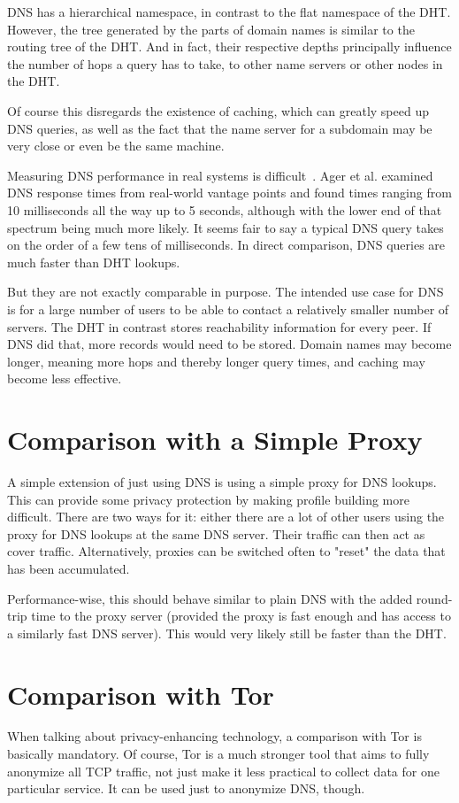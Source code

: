 DNS has a hierarchical namespace, in contrast to the flat namespace of the DHT.
However, the tree generated by the parts of domain names is similar to the
routing tree of the DHT. And in fact, their respective depths principally
influence the number of hops a query has to take, to other name servers or other
nodes in the DHT.

Of course this disregards the existence of caching, which can greatly speed up
DNS queries, as well as the fact that the name server for a subdomain may be
very close or even be the same machine.

Measuring DNS performance in real systems is
difficult~\cite{liston2002diversity}. Ager et al.\cite{ager2010comparing}
examined DNS response times from real-world vantage points and found times
ranging from 10 milliseconds all the way up to 5 seconds, although with the
lower end of that spectrum being much more likely. It seems fair to say a
typical DNS query takes on the order of a few tens of milliseconds. In direct
comparison, DNS queries are much faster than DHT lookups.

But they are not exactly comparable in purpose. The intended use case for DNS is
for a large number of users to be able to contact a relatively smaller number of
servers. The DHT in contrast stores reachability information for every peer. If
DNS did that, more records would need to be stored. Domain names may become
longer, meaning more hops and thereby longer query times, and caching may become
less effective.

\section{Comparison with a Simple Proxy}
A simple extension of just using DNS is using a simple proxy for DNS lookups.
This can provide some privacy protection by making profile building more
difficult. There are two ways for it: either there are a lot of other users
using the proxy for DNS lookups at the same DNS server. Their traffic can then
act as cover traffic. Alternatively, proxies can be switched often to "reset"
the data that has been accumulated.

Performance-wise, this should behave similar to plain DNS with the added
round-trip time to the proxy server (provided the proxy is fast enough and has
access to a similarly fast DNS server). This would very likely still be faster
than the DHT.

\section{Comparison with Tor}
When talking about privacy-enhancing technology, a comparison with Tor is
basically mandatory. Of course, Tor is a much stronger tool that aims to fully
anonymize all TCP traffic, not just make it less practical to collect data for
one particular service. It can be used just to anonymize DNS, though.

